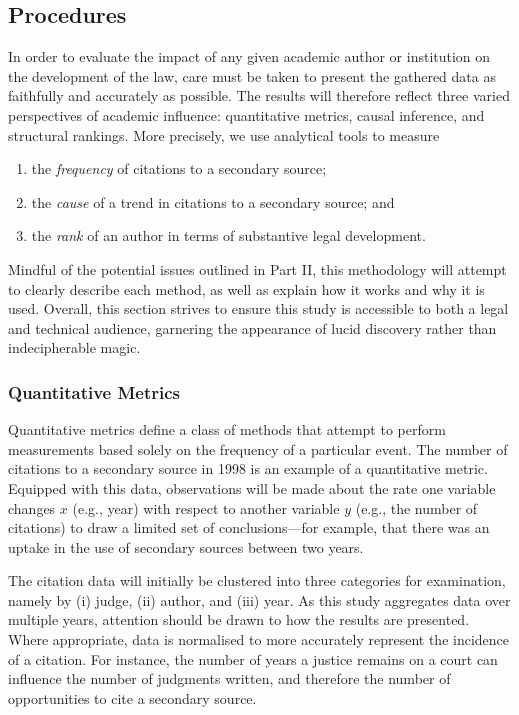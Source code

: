\let\xn\xnote
\subsection{Procedures}

In order to evaluate the impact of any given academic author or institution on the development of the law, care must be taken to present the gathered data as faithfully and accurately as possible.\xn{3b-0} The results will therefore reflect three varied perspectives of academic influence: quantitative metrics, causal inference, and structural rankings. More precisely, we use analytical tools to measure
\begin{enumerate}
    \item the \emph{frequency} of citations to a secondary source;
    \item the \emph{cause} of a trend in citations to a secondary source; and
    \item the \emph{rank} of an author in terms of substantive legal development.
\end{enumerate}
Mindful of the potential issues outlined in Part II, this methodology will attempt to clearly describe each method, as well as explain how it works and why it is used. Overall, this section strives to ensure this study is accessible to both a legal and technical audience, garnering the appearance of lucid discovery rather than indecipherable magic.

\subsubsection{Quantitative Metrics}
Quantitative metrics define a class of methods that attempt to perform measurements based solely on the frequency of a particular event.\xn{3b-4} The number of citations to a secondary source in 1998 is an example of a quantitative metric. Equipped with this data, observations will be made about the rate one variable changes $x$ (e.g., year) with respect to another variable $y$ (e.g., the number of citations) to draw a limited set of conclusions\xn{3b-5}---for example, that there was an uptake in the use of secondary sources between two years.

The citation data will initially be clustered into three categories for examination, namely by (i) judge, (ii) author, and (iii) year. As this study aggregates data over multiple years, attention should be drawn to how the results are presented. Where appropriate, data is normalised to more accurately represent the incidence of a citation. For instance, the number of years a justice remains on a court can influence the number of judgments written, and therefore the number of opportunities to cite a secondary source.

